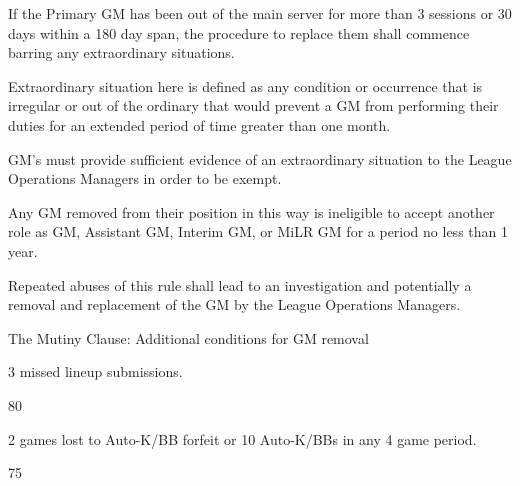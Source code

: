 	\begin{deepEnumerate}
		\item If the Primary GM has been out of the main server for more than 3 sessions or 30 days within a 180 day span, the procedure to replace them shall commence barring any extraordinary situations.
		\begin{deepEnumerate}
			\item Extraordinary situation here is defined as any condition or occurrence that is irregular or out of the ordinary that would prevent a GM from performing their duties for an extended period of time greater than one month.
			\item GM’s must provide sufficient evidence of an extraordinary situation to the League Operations Managers in order to be exempt.
			\item Any GM removed from their position in this way is ineligible to accept another role as GM, Assistant GM, Interim GM, or MiLR GM for a period no less than 1 year.
			\item Repeated abuses of this rule shall lead to an investigation and potentially a removal and replacement of the GM by the League Operations Managers.
		\end{deepEnumerate}
	\end{deepEnumerate}
	\item The Mutiny Clause: Additional conditions for GM removal 
	\begin{deepEnumerate}
		\item 3 missed lineup submissions.
		\item 80%
		\item 2 games lost to Auto-K/BB forfeit or 10 Auto-K/BBs in any 4 game period.
		\item 75%
\end{deepEnumerate}

